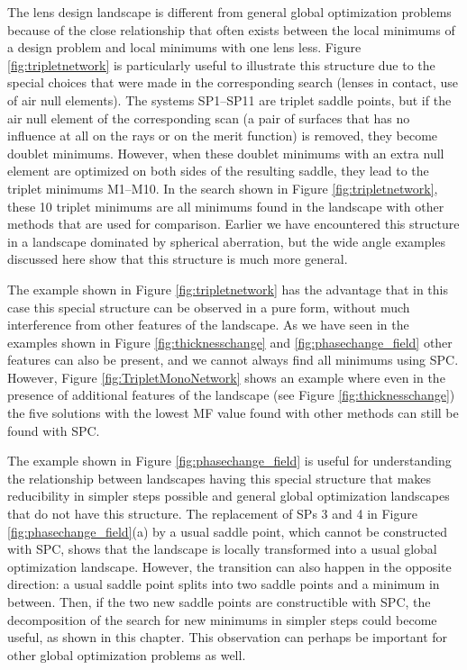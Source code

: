 The lens design landscape is different from general global optimization problems because of the close relationship that often exists between the local minimums of a design problem and local minimums with one lens less. Figure \ref{fig:tripletnetwork} is particularly useful to illustrate this structure due to the special choices that were made in the corresponding search (lenses in contact, use of air null elements). The systems SP1–SP11 are triplet saddle points, but if the air null element of the corresponding scan (a pair of surfaces that has no influence at all on the rays or on the merit function) is removed, they become doublet minimums. However, when these doublet minimums with an extra null element are optimized on both sides of the resulting saddle, they lead to the triplet minimums M1–M10. In the search shown in Figure \ref{fig:tripletnetwork}, these 10 triplet minimums are all minimums found in the landscape with other methods that are used for comparison. Earlier we have encountered this structure in a landscape dominated by spherical aberration, but the wide angle examples discussed here show that this structure is much more general.

The example shown in Figure \ref{fig:tripletnetwork} has the advantage that in this case this special structure can be observed in a pure form, without much interference from other features of the landscape. As we have seen in the examples shown in Figure \ref{fig:thicknesschange} and \ref{fig:phasechange_field} other features can also be present, and we cannot always find all minimums using SPC. However, Figure \ref{fig:TripletMonoNetwork} shows an example where even in the presence of additional features of the landscape (see Figure \ref{fig:thicknesschange}) the five solutions with the lowest MF value found with other methods can still be found with SPC.

The example shown in Figure \ref{fig:phasechange_field} is useful for understanding the relationship between landscapes having this special structure that makes reducibility in simpler steps possible and general global optimization landscapes that do not have this structure. The replacement of SPs 3 and 4 in Figure \ref{fig:phasechange_field}(a) by a usual saddle point, which cannot be constructed with SPC, shows that the landscape is locally transformed into a usual global optimization landscape. However, the transition can also happen in the opposite direction: a usual saddle point splits into two saddle points and a minimum in between. Then, if the two new saddle points are constructible with SPC, the decomposition of the search for new minimums in simpler steps could become useful, as shown in this chapter. This observation can perhaps be important for other global optimization problems as well.

